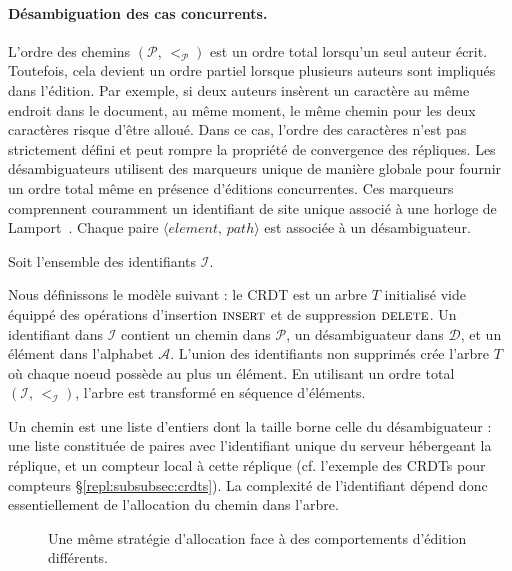 \paragraph{Désambiguation des cas concurrents.}

L'ordre des chemins $(\mathcal{P},\, <_\mathcal{P})$ est un ordre total
lorsqu'un seul auteur écrit. Toutefois, cela devient un ordre partiel lorsque
plusieurs auteurs sont impliqués dans l'édition. Par exemple, si deux auteurs
insèrent un caractère au même endroit dans le document, au même moment, le même
chemin pour les deux caractères risque d'être alloué. Dans ce cas, l'ordre des
caractères n'est pas strictement défini et peut rompre la propriété de
convergence des répliques. Les désambiguateurs utilisent des marqueurs unique de
manière globale pour fournir un ordre total même en présence d'éditions
concurrentes. Ces marqueurs comprennent couramment un identifiant de site unique
associé à une horloge de Lamport~\cite{lamport1978time}. Chaque paire
$\langle element,\, path\rangle$ est associée à un désambiguateur.

Soit l'ensemble des identifiants $\mathcal{I}$.


Nous définissons le modèle suivant : le CRDT est un arbre $T$ initialisé vide
équippé des opérations d'insertion $\textsc{insert}$ et de suppression
$\textsc{delete}$. Un identifiant dans $\mathcal{I}$ contient un chemin dans
$\mathcal{P}$, un désambiguateur dans $\mathcal{D}$, et un élément dans
l'alphabet $\mathcal{A}$. L'union des identifiants non supprimés crée l'arbre
$T$ où chaque noeud possède au plus un élément.  En utilisant un ordre total
$(\mathcal{I},\, <_\mathcal{I})$, l'arbre est transformé en séquence d'éléments.

Un chemin est une liste d'entiers dont la taille borne celle du désambiguateur :
une liste constituée de paires avec l'identifiant unique du serveur hébergeant
la réplique, et un compteur local à cette réplique (cf. l'exemple des CRDTs pour
compteurs §\ref{repl:subsubsec:crdts}). La complexité de l'identifiant dépend donc
essentiellement de l'allocation du chemin dans l'arbre.

\begin{figure}
  \begin{center}
  \hspace{30pt}
  \end{center}
  \caption{Une même stratégie d'allocation face à des comportements d'édition
    différents.}
\end{figure}

